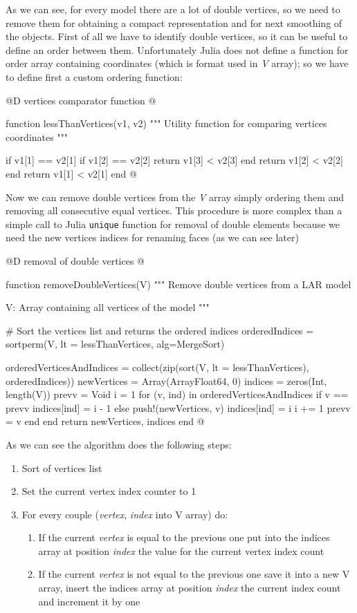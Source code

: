 \documentclass[11pt,oneside]{article}	%
\begin{document}
As we can see, for every model there are a lot of double vertices, so we need to remove them for obtaining a compact representation and for next smoothing of the objects. First of all we have to identify double vertices, so it can be useful to define an order between them. Unfortunately Julia does not define a function for order array containing coordinates (which is format used in \textit{V} array); so we have to define first a custom ordering function:

@D vertices comparator function
@{function lessThanVertices(v1, v2)
  """
  Utility function for comparing vertices coordinates
  """

  if v1[1] == v2[1]
    if v1[2] == v2[2]
      return v1[3] < v2[3]
    end
    return v1[2] < v2[2]
  end
  return v1[1] < v2[1]
end @}

Now we can remove double vertices from the \textit{V} array simply ordering them and removing all consecutive equal vertices. This procedure is more complex than a simple call to Julia \texttt{unique} function for removal of double elements because we need the new vertices indices for renaming faces (as we can see later)

@D removal of double vertices
@{function removeDoubleVertices(V)
  """
  Remove double vertices from a LAR model

  V: Array containing all vertices of the model
  """

  # Sort the vertices list and returns the ordered indices
  orderedIndices = sortperm(V, lt = lessThanVertices, alg=MergeSort)

  orderedVerticesAndIndices = collect(zip(sort(V, lt = lessThanVertices),
                                          orderedIndices))
  newVertices = Array(Array{Float64}, 0)
  indices = zeros(Int, length(V))
  prevv = Void
  i = 1
  for (v, ind) in orderedVerticesAndIndices
    if v == prevv
      indices[ind] = i - 1
    else
      push!(newVertices, v)
      indices[ind] = i
      i += 1
      prevv = v
    end
  end
  return newVertices, indices
end @}

As we can see the algorithm does the following steps:
\begin{enumerate}
 \item Sort of vertices list
 \item Set the current vertex index counter to 1
 \item For every couple (\textit{vertex}, \textit{index} into V array) do:
 \begin{enumerate}
  \item If the current \textit{vertex} is equal to the previous one put into the indices array at position \textit{index} the value for the current vertex index count
  \item If the current \textit{vertex} is not equal to the previous one save it into a new V array, insert the indices array at position \textit{index} the current index count and increment it by one
 \end{enumerate}
\end{enumerate}
\end{document}
